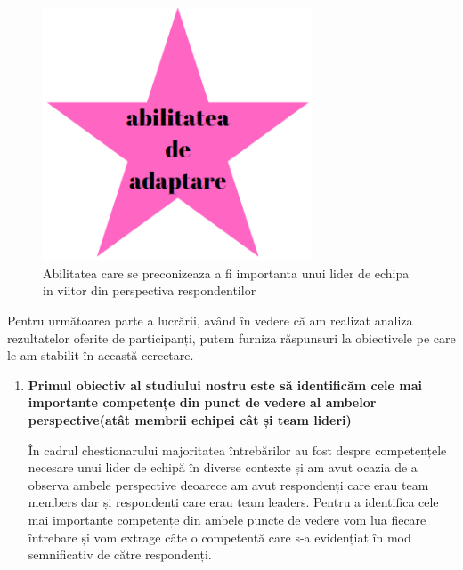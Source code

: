 \documentclass[a4paper, 12pt]{article}
\begin{document}
\begin{enumerate}[A)]
	\quad \begin{figure}[!htb]
			\centering
			\includegraphics[width=8cm, height=6 cm]{"figures/future.png"}
			\caption {Abilitatea care se preconizeaza a fi importanta unui lider de echipa in viitor din perspectiva respondentilor}\label{fig:four}
			
		\end{figure}

	\quad Pentru următoarea parte a lucrării, având în vedere că am realizat analiza rezultatelor oferite de participanți, putem furniza răspunsuri la obiectivele pe care le-am stabilit în această cercetare.

	\begin{enumerate}[(1)]

	\item \textbf{ Primul obiectiv al studiului nostru este să identificăm cele mai importante competențe din punct de vedere al ambelor perspective(atât membrii echipei cât și team lideri)}

	\quad În cadrul chestionarului majoritatea întrebărilor au fost despre competențele necesare unui lider de echipă în diverse contexte și am avut ocazia de a observa ambele perspective deoarece am avut respondenți care erau team members dar și respondenti care erau team leaders. Pentru a identifica cele mai importante competențe din ambele puncte de vedere vom lua fiecare întrebare și vom extrage câte o competență care s-a evidențiat în mod semnificativ de către respondenți. 
\begin{itemize}


\end{itemize}
\end{enumerate}
\end{enumerate}
\end{document}
